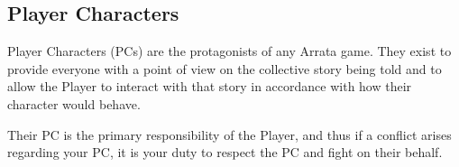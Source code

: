 \documentclass[../main.tex]{subfiles}
\begin{document}
    \subsection{Player Characters}

    Player Characters (PCs) are the protagonists of any Arrata game. They exist to provide everyone with a point of view on the collective story being told and to allow the Player to interact with that story in accordance with how their character would behave. 
    
    Their PC is the primary responsibility of the Player, and thus if a conflict arises regarding your PC, it is your duty to respect the PC and fight on their behalf.
\end{document}
